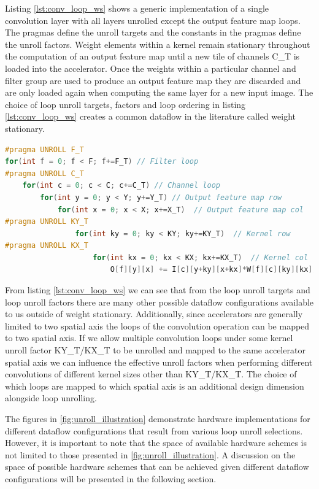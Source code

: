 Listing \ref{lst:conv_loop_ws} shows a generic
implementation of a single convolution layer with all layers unrolled except the
output feature map loops. The pragmas define the unroll
targets and the constants in the pragmas define the unroll factors. 
Weight elements within a
kernel remain stationary throughout the computation of an output feature map
until a new tile of channels C\_T is loaded into the accelerator. Once the
weights within a particular channel and filter group are used to produce an
output feature map they are discarded and are only loaded again when computing
the same layer for a new input image. The choice of loop unroll targets, factors
and loop ordering in listing \ref{lst:conv_loop_ws} creates a common dataflow in
the literature called weight stationary.

\begin{minipage}{\linewidth}
    \begin{lstlisting}[language=C, caption=Convolution implemented as nested loops, label={lst:conv_loop_ws}]
#pragma UNROLL F_T
for(int f = 0; f < F; f+=F_T) // Filter loop
#pragma UNROLL C_T
    for(int c = 0; c < C; c+=C_T) // Channel loop
        for(int y = 0; y < Y; y+=Y_T) // Output feature map row
            for(int x = 0; x < X; x+=X_T)  // Output feature map col
#pragma UNROLL KY_T
                for(int ky = 0; ky < KY; ky+=KY_T)  // Kernel row
#pragma UNROLL KX_T
                    for(int kx = 0; kx < KX; kx+=KX_T)  // Kernel col
                        O[f][y][x] += I[c][y+ky][x+kx]*W[f][c][ky][kx];
    \end{lstlisting}
\end{minipage}
 

From listing \ref{lst:conv_loop_ws} we
can see that from the loop unroll targets and loop unroll factors there are many
other possible dataflow configurations available to us outside of weight
stationary. Additionally, since accelerators are generally limited to two
spatial axis the loops of the convolution operation can be mapped to two spatial
axis. If we allow multiple convolution loops under some kernel unroll factor
KY\_T/KX\_T  to be unrolled and mapped to the same accelerator spatial axis we
can influence the effective unroll factors when performing different
convolutions of different kernel sizes other than KY\_T/KX\_T. The choice of
which loops are mapped to which spatial axis is an additional design dimension
alongside loop unrolling. 

The figures in \autoref{fig:unroll_illustration} demonstrate hardware
implementations for different dataflow configurations that result from various
loop unroll selections. However, it is important to note that the space of
available hardware schemes is not limited to those presented in
\autoref{fig:unroll_illustration}. A discussion on the space of possible
hardware schemes that can be achieved given different dataflow configurations
will be presented in the following section.


